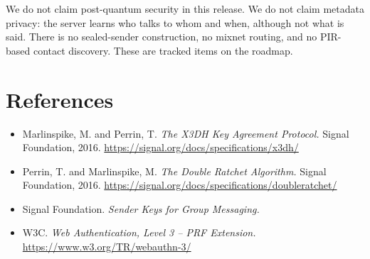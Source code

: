 \documentclass[11pt,a4paper]{article}
\begin{document}
We do not claim post-quantum security in this release. We do not claim
metadata privacy: the server learns who talks to whom and when,
although not what is said. There is no sealed-sender construction, no
mixnet routing, and no PIR-based contact discovery. These are tracked
items on the roadmap.

\section*{References}
\begin{itemize}
  \item Marlinspike, M. and Perrin, T. \emph{The X3DH Key Agreement
    Protocol.} Signal Foundation, 2016. \url{https://signal.org/docs/specifications/x3dh/}
  \item Perrin, T. and Marlinspike, M. \emph{The Double Ratchet
    Algorithm.} Signal Foundation, 2016.
    \url{https://signal.org/docs/specifications/doubleratchet/}
  \item Signal Foundation. \emph{Sender Keys for Group Messaging.}
  \item W3C. \emph{Web Authentication, Level 3 -- PRF Extension.}
    \url{https://www.w3.org/TR/webauthn-3/}
\end{itemize}
\end{document}
